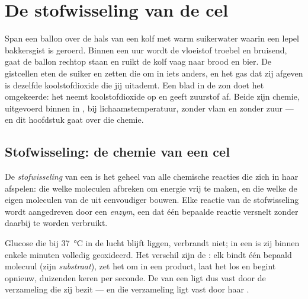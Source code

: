 \chapter{De stofwisseling van de cel}\label{ch:g10:cell-metabolism}

Span een ballon over de hals van een kolf met warm suikerwater waarin
een lepel bakkersgist is geroerd. Binnen een uur wordt de vloeistof
troebel en bruisend, gaat de ballon rechtop staan en ruikt de kolf vaag
naar brood en bier. De gistcellen eten de suiker en zetten die om in
iets anders, en het gas dat zij afgeven is dezelfde koolstofdioxide die
jij uitademt. Een blad in de zon doet het omgekeerde: het neemt
koolstofdioxide op en geeft zuurstof af. Beide zijn chemie, uitgevoerd
binnen in , bij lichaamstemperatuur, zonder vlam en zonder zuur
--- en dit hoofdstuk gaat over die chemie.

\section{Stofwisseling: de chemie van een cel}

\begin{definition}[Stofwisseling]\label{def:g10:cell-metabolism:metabolism}
De \emph{stofwisseling} van een  is het geheel
van alle chemische reacties die zich in haar afspelen: die welke
moleculen afbreken om energie vrij te maken, en die welke de eigen
moleculen van de  uit eenvoudiger bouwen. Elke reactie van de
stofwisseling wordt aangedreven door een \emph{enzym}, een
 dat één bepaalde reactie versnelt zonder daarbij te worden
verbruikt.
\end{definition}

\begin{proposition}\label{prop:g10:cell-metabolism:enzymes}
Glucose die bij \qty{37}{\celsius} in de lucht blijft liggen, verbrandt
niet; in een  is zij binnen enkele minuten volledig geoxideerd. Het
verschil zijn de : elk  bindt één bepaald molecuul (zijn
\emph{substraat}), zet het om in een product, laat het los en begint
opnieuw, duizenden keren per seconde. De  van een  ligt
dus vast door de verzameling  die zij bezit --- en die
verzameling ligt vast door haar .
\end{proposition}
\admitted

